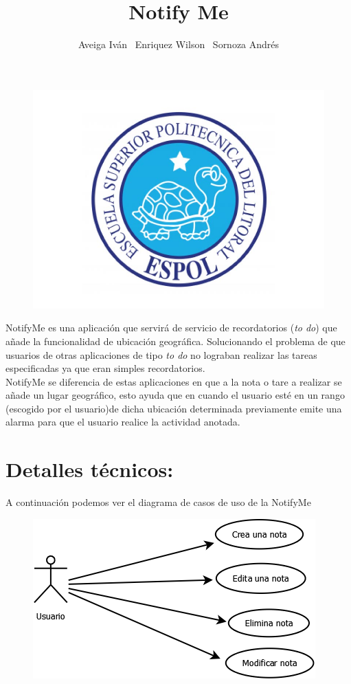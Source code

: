 \documentclass[a4paper,11pt]{article}
\begin{document}
	\author{
	Aveiga Iván \ Enriquez Wilson \ Sornoza Andrés
	}
\title{Notify Me}
\maketitle
\begin{figure}[h]
\centering
\includegraphics[width=0.7\linewidth]{./logo}
\end{figure}

\vspace{7mm}
\newpage

NotifyMe es una aplicación que servirá de servicio de recordatorios (\emph{to do}) que añade la funcionalidad de ubicación geográfica. Solucionando el problema de que usuarios de otras aplicaciones de tipo \emph{to do} no lograban realizar las tareas especificadas ya que eran simples recordatorios. \\

NotifyMe se diferencia de estas aplicaciones en que a la nota o tare a realizar se añade un lugar geográfico, esto ayuda que en cuando el usuario esté en un rango (escogido por el usuario)de dicha ubicación determinada previamente emite una alarma para que el usuario realice la actividad anotada.

\section{\textbf{Detalles técnicos:}}
A continuación podemos ver el diagrama de casos de uso de la NotifyMe \\
\begin{figure}[h]
\centering
\includegraphics[width=0.7\linewidth]{./CasoDeUso}
\end{figure}
\end{document}
